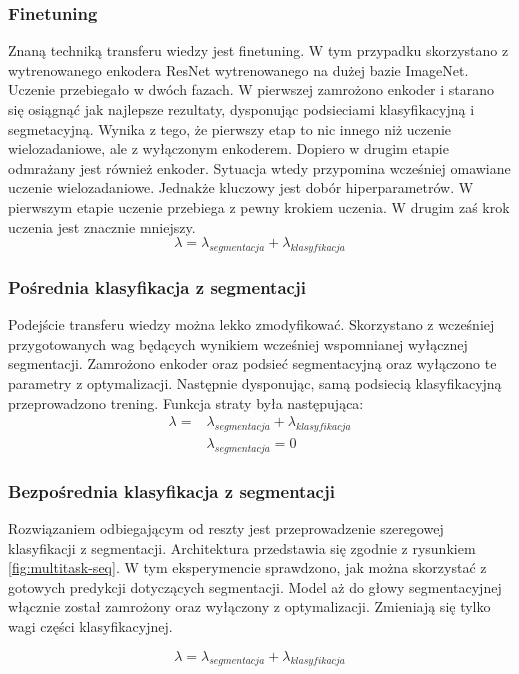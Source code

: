 \subsubsection{Finetuning}
Znaną techniką transferu wiedzy jest finetuning. W tym przypadku skorzystano z wytrenowanego enkodera ResNet wytrenowanego na dużej bazie ImageNet. Uczenie przebiegało w dwóch fazach. W pierwszej zamrożono enkoder i starano się osiągnąć jak najlepsze rezultaty, dysponując podsieciami klasyfikacyjną i segmetacyjną. Wynika z tego, że pierwszy etap to nic innego niż uczenie wielozadaniowe, ale z wyłączonym enkoderem. Dopiero w drugim etapie odmrażany jest również enkoder. Sytuacja wtedy przypomina wcześniej omawiane uczenie wielozadaniowe. Jednakże kluczowy jest dobór hiperparametrów. W pierwszym etapie uczenie przebiega z pewny krokiem uczenia. W drugim zaś krok uczenia jest znacznie mniejszy.
\begin{equation*}
\lambda = \lambda_{segmentacja} + \lambda_{klasyfikacja}
\end{equation*}
\subsubsection{Pośrednia klasyfikacja z segmentacji}
Podejście transferu wiedzy można lekko zmodyfikować. Skorzystano z wcześniej przygotowanych wag będących wynikiem wcześniej wspomnianej wyłącznej segmentacji. Zamrożono enkoder oraz podsieć segmentacyjną oraz wyłączono te parametry z optymalizacji. Następnie dysponując, samą podsiecią klasyfikacyjną przeprowadzono trening. Funkcja straty była następująca:
\begin{align*}
\lambda  = & \lambda_{segmentacja} + \lambda_{klasyfikacja} \\
           & \lambda_{segmentacja} = 0
\end{align*}
\subsubsection{Bezpośrednia klasyfikacja z segmentacji}
Rozwiązaniem odbiegającym od reszty jest przeprowadzenie szeregowej klasyfikacji z segmentacji. Architektura przedstawia się zgodnie z rysunkiem \ref{fig:multitask-seq}. W tym eksperymencie sprawdzono, jak można skorzystać z gotowych predykcji dotyczących segmentacji. Model aż do głowy segmentacyjnej włącznie został zamrożony oraz wyłączony z optymalizacji. Zmieniają się tylko wagi części klasyfikacyjnej.

\begin{equation*}
\lambda = \lambda_{segmentacja} + \lambda_{klasyfikacja}
\end{equation*}





